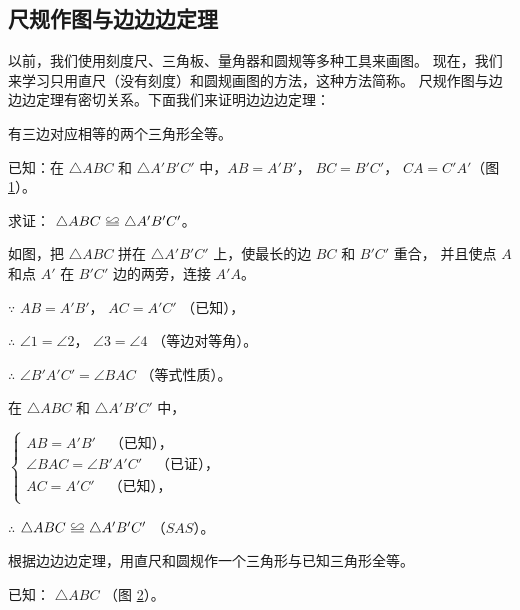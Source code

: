 \subsection{尺规作图与边边边定理}\label{subsec:czjh1-3-10}

以前，我们使用刻度尺、三角板、量角器和圆规等多种工具来画图。
现在，我们来学习只用直尺（没有刻度）和圆规画图的方法，这种方法简称。
尺规作图与边边边定理有密切关系。下面我们来证明边边边定理：
\begin{dingli}
    有三边对应相等的两个三角形全等。
\end{dingli}

已知：在 $\triangle ABC$ 和 $\triangle A'B'C'$ 中，$AB = A'B'$， $BC = B'C'$， $CA = C'A'$（图 \ref{fig:czjh1-3-39}）。

\begin{figure}[htbp]
    \centering
    
    \caption{}\label{fig:czjh1-3-39}
\end{figure}

求证： $\triangle ABC \quandeng \triangle A'B'C'$。

\zhengming 如图，把 $\triangle ABC$ 拼在 $\triangle A'B'C'$ 上，使最长的边 $BC$ 和 $B'C'$ 重合，
并且使点 $A$ 和点 $A'$ 在 $B'C'$ 边的两旁，连接 $A'A$。

$\because$ \quad $AB = A'B'$， $AC = A'C'$ （已知），

$\therefore$ \quad $\angle 1 = \angle 2$， $\angle 3 = \angle 4$ （等边对等角）。

$\therefore$ \quad $\angle B'A'C' = \angle BAC$ （等式性质）。

在 $\triangle ABC$ 和 $\triangle A'B'C'$ 中，

\qquad $\begin{cases}
    AB = A'B' \quad \text{（已知），} \\
    \angle BAC = \angle B'A'C' \quad \text{（已证），} \\
    AC = A'C' \quad \text{（已知），} \\
\end{cases}$

$\therefore$ \quad $\triangle ABC \quandeng \triangle A'B'C'$ （$SAS$）。


\liti[0] 根据边边边定理，用直尺和圆规作一个三角形与已知三角形全等。

已知： $\triangle ABC$ （图 \ref{fig:czjh1-3-40}）。

\begin{figure}[htbp]
    \centering
    
    \caption{}\label{fig:czjh1-3-40}
\end{figure}


